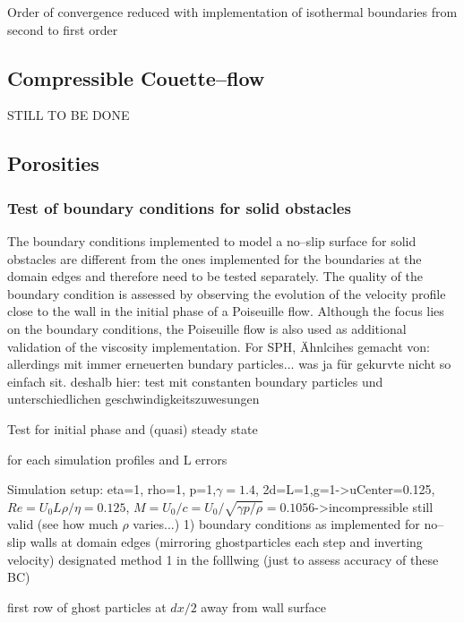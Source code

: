 \documentclass{report}
\begin{document}
Order of convergence reduced with implementation of isothermal boundaries from second to first order \cite{Cleary1999}

\subsection{Compressible Couette--flow}
STILL TO BE DONE

\subsection{Porosities}

\subsubsection{Test of boundary conditions for solid obstacles}

The boundary conditions implemented to model a no--slip surface for solid obstacles are different from the ones implemented for the boundaries at the domain edges and therefore need to be tested separately. The quality of the boundary condition is assessed by observing the evolution of the velocity profile close to the wall in the initial phase of a Poiseuille flow. Although the focus lies on the boundary conditions, the Poiseuille flow is also used as additional validation of the viscosity implementation. 
For SPH, Ähnlcihes gemacht von: \cite{Basa2009} allerdings mit immer erneuerten bundary particles... was ja für gekurvte nicht so einfach sit. deshalb hier: test mit constanten boundary particles und unterschiedlichen geschwindigkeitszuwesungen


Test for initial phase and (quasi) steady state

for each simulation profiles and L errors

Simulation setup: eta=1, rho=1, p=1,$\gamma=1.4$, 2d=L=1,g=1->uCenter=0.125, $Re=U_0 L \rho/\eta=0.125$, $M=U_0/c=U_0/\sqrt{\gamma p/\rho}=0.1056$->incompressible still valid (see how much $\rho$ varies...)
1) boundary conditions as implemented for no--slip walls at domain edges
(mirroring ghostparticles each step and inverting velocity) designated method 1 in the folllwing
(just to assess accuracy of these BC)

first row of ghost particles at $dx/2$ away from wall surface
\end{document}

